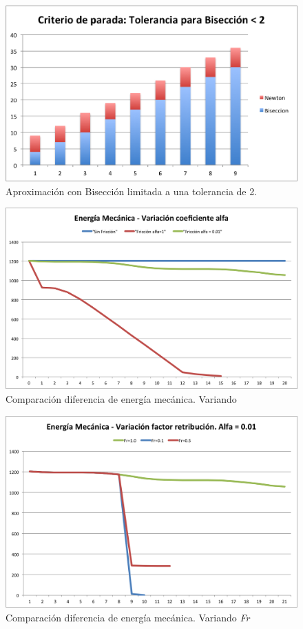 \documentclass[a4paper]{article}
\begin{document}
\begin{figure}[H]
  \centering
  \includegraphics[scale=0.80]{graficos/3-BiseccionXTolerancia.png}
  \caption{Aproximación con Bisección limitada a una tolerancia de 2. }
\end{figure}

\begin{figure}[H]
  \centering
  \includegraphics[scale=0.75]{graficos/4-energiaMecanica-alpha.png}
  \caption{Comparación diferencia de energía mecánica. Variando \alpha }
\end{figure}

\begin{figure}[H]
  \centering
  \includegraphics[scale=0.75]{graficos/5-energiaMecanica-fr.png}
  \caption{Comparación diferencia de energía mecánica. Variando \textit{Fr} }
\end{figure}
\end{document}
